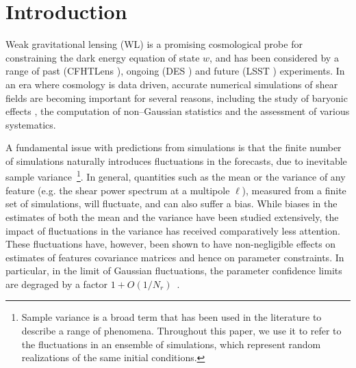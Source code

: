\documentclass[reprint,aps,prd,superscriptaddress,showkeys,showpacs]{revtex4-1}
\begin{document}

\maketitle



\section{Introduction}
%
Weak gravitational lensing (WL) is a promising cosmological probe for
constraining the dark energy equation of state $w$, and has been
considered by a range of past (CFHTLens \citep{cfht1,cfht2}),
ongoing (DES \citep{DES}) and future (LSST \citep{LSST})
experiments. In an era where cosmology is data driven, accurate
numerical simulations of shear fields are becoming important for
several reasons, including the study of baryonic effects
\citep{BaryonXiuyuan}, 
the computation of non--Gaussian statistics
\citep{PeaksJan,MinkJan,MinkPetri} 
and the  assessment of various systematics.

A fundamental issue with predictions from simulations is that the
finite number of simulations naturally introduces fluctuations in the
forecasts, due to inevitable sample variance~\footnote{Sample variance is a broad term that has been used in the literature to describe a range of phenomena.  Throughout this paper, we use it to refer to the fluctuations in an ensemble of simulations, which represent random realizations of the same initial conditions.}.
In general, quantities such as the mean or the variance of any feature
(e.g. the shear power spectrum at a multipole $\ell$), measured from a
finite set of simulations, will fluctuate, and can also suffer a bias.
While biases in the estimates of both the mean and the variance have
been studied extensively, the impact of fluctuations in the variance
has received comparatively less attention.  These fluctuations have,
however, been shown to have non-negligible effects on estimates of
features covariance matrices and hence on parameter constraints. In
particular, in the limit of Gaussian fluctuations, the parameter
confidence limits are degraged by a factor
$1+O(1/N_r)$~\citep{DodelsonSchneider13}.
\end{document}
